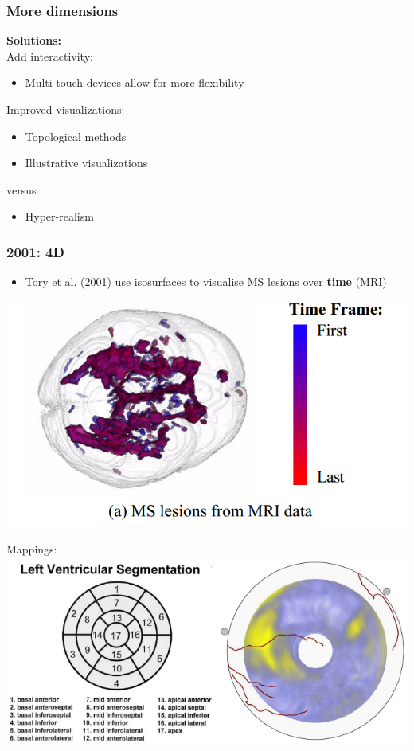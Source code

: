 \documentclass{beamer}
\begin{document}
\begin{frame}
	\frametitle{More dimensions}
	\textbf{Solutions:}\\
	Add interactivity:
	\begin{itemize}
		\item Multi-touch devices allow for more flexibility
	\end{itemize}
	Improved visualizations:\\
	\begin{itemize}
		\item Topological methods
		\item Illustrative visualizations
	\end{itemize}
	versus
	\begin{itemize}
		\item Hyper-realism
	\end{itemize}
\end{frame}

\begin{frame}
	\frametitle{2001: 4D}
	\begin{itemize}
		\item Tory et al. (2001) use isosurfaces to visualise MS lesions over
			\textbf{time} (MRI)
	\end{itemize}
	\begin{center}
		\includegraphics[width=.8\textwidth]{images/ms_time}
	\end{center}
\end{frame}

\begin{frame}
	Mappings:
	\includegraphics[width=\textwidth]{images/heart}
\end{frame}
\end{document}
